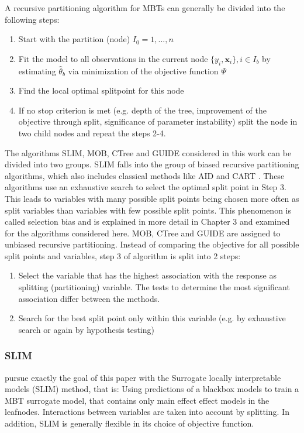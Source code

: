 A recursive partitioning algorithm for MBTs can generally be divided into the following steps:
\begin{enumerate}
    \item Start with the partition (node) $I_0 = 1,...,n$
    \item Fit the model to all observations in the current node $\{y_{i}, \mathbf{x}_{i}\}, i \in I_b$ by estimating $\hat{\theta}_b$ via minimization of the objective function $\Psi$
    \item Find the local optimal splitpoint for this node 
    \item If no stop criterion is met (e.g. depth of the tree, improvement of the objective through split, significance of parameter instability) split the node in two child nodes and repeat the steps 2-4.
\end{enumerate}


The algorithms SLIM, MOB, CTree and GUIDE considered in this work can be divided into two groups. SLIM falls into the group of biased recursive partitioning algorithms, which also includes classical methods like AID \citep{Morgan.1963} and CART \citep{Breiman.1984}. These algorithms use an exhaustive search to select the optimal split point in Step 3. This leads to variables with many possible split points being chosen more often as split variables than variables with few possible split points. This phenomenon is called selection bias and is explained in more detail in Chapter 3 and examined for the algorithms considered here.
MOB, CTree and GUIDE are assigned to unbiased recursive partitioning. Instead of comparing the objective for all possible split points and variables, step 3 of algorithm is split into 2 steps:

\begin{enumerate}
    \item Select the variable that has the highest association with the response as splitting (partitioning) variable. The tests to determine the most significant association differ between the methods.
    \item Search for the best split point only within this variable (e.g. by exhaustive search or again by hypothesis testing)
\end{enumerate}

\citep{Schlosser.2019}



\subsubsection{SLIM}
\citep{Hu.2020} pursue exactly the goal of this paper with the Surrogate locally interpretable models (SLIM) method, that is: Using predictions of a blackbox models to train a MBT surrogate model, that contains only main effect effect models in the leafnodes. Interactions between variables are taken into account by splitting. In addition, SLIM is generally flexible in its choice of objective function.

